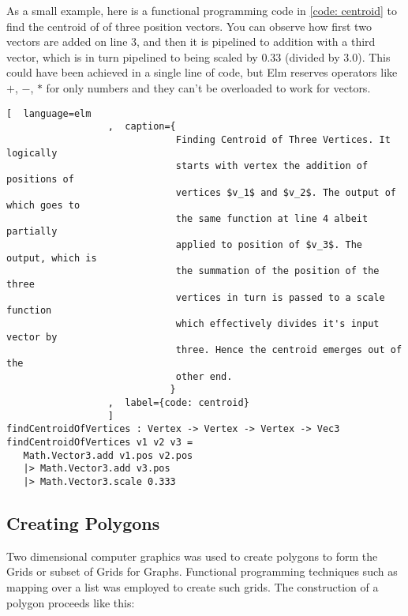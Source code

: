 As a small example, here is a functional programming code in \autoref{code:
centroid} to find the centroid of of three position vectors. You can observe
how first two vectors are added on line 3, and then it is pipelined to addition
with a third vector, which is in turn pipelined to being scaled by $0.33$
(divided by $3.0$). This could have been achieved in a single line of code, but
Elm reserves operators like $+$, $-$, $*$ for only numbers and they can't be
overloaded to work for vectors.


\begin{lstlisting}[  language=elm
                  ,  caption={
                              Finding Centroid of Three Vertices. It logically
                              starts with vertex the addition of positions of
                              vertices $v_1$ and $v_2$. The output of which goes to
                              the same function at line 4 albeit partially
                              applied to position of $v_3$. The output, which is
                              the summation of the position of the three
                              vertices in turn is passed to a scale function
                              which effectively divides it's input vector by
                              three. Hence the centroid emerges out of the
                              other end.
                             }
                  ,  label={code: centroid}
                  ]
findCentroidOfVertices : Vertex -> Vertex -> Vertex -> Vec3
findCentroidOfVertices v1 v2 v3 =
   Math.Vector3.add v1.pos v2.pos
   |> Math.Vector3.add v3.pos
   |> Math.Vector3.scale 0.333
\end{lstlisting}

\subsection{Creating Polygons}
Two dimensional computer graphics was used to create polygons to form the Grids
or subset of Grids for Graphs. Functional programming techniques such as mapping
over a list was employed to create such grids. 
The construction of a polygon proceeds like this:

